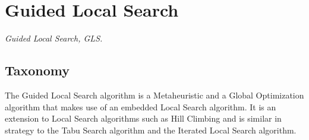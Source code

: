 

\section{Guided Local Search} 
\label{sec:guided_local_search}

\emph{Guided Local Search, GLS.}

\subsection{Taxonomy}
The Guided Local Search algorithm is a Metaheuristic and a Global Optimization algorithm that makes use of an embedded Local Search algorithm.
It is an extension to Local Search algorithms such as Hill Climbing and is similar in strategy to the Tabu Search algorithm and the Iterated Local Search algorithm.

